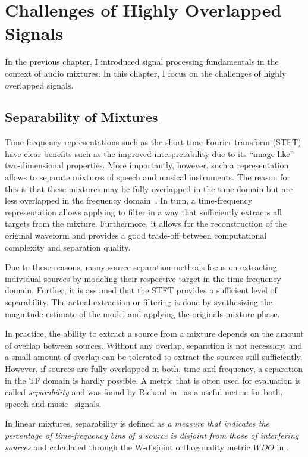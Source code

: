 \hypertarget{highly-overlapped-signals}{%
\chapter{Challenges of Highly Overlapped Signals}\label{cha:highly-overlapped-signals}}

In the previous chapter, I introduced signal processing fundamentals in the context of audio mixtures. In this chapter, I focus on the challenges of highly overlapped signals.

\hypertarget{separability-of-mixtures}{%
\section{Separability of Mixtures}\label{separability-of-mixtures}}

Time-frequency representations such as the short-time Fourier transform (STFT) have clear benefits such as the improved interpretability due to its ``image-like'' two-dimensional properties.
More importantly, however, such a representation allows to separate mixtures of speech and musical instruments.
The reason for this is that these mixtures may be fully overlapped in the time domain but are less overlapped in the frequency domain~\cite{rickard02, giannoulis11, rafii}.
In turn, a time-frequency representation allows applying to filter in a way that sufficiently extracts all targets from the mixture.
Furthermore, it allows for the reconstruction of the original waveform and provides a good trade-off between computational complexity and separation quality.
\par
Due to these reasons, many source separation methods focus on extracting individual sources by modeling their respective target in the time-frequency domain.
Further, it is assumed that the STFT provides a sufficient level of separability.
The actual extraction or filtering is done by synthesizing the magnitude estimate of the model and applying the originals mixture phase.
\par
In practice, the ability to extract a source from a mixture depends on the amount of overlap between sources.
Without any overlap, separation is not necessary, and a small amount of overlap can be tolerated to extract the sources still sufficiently.
However, if sources are fully overlapped in both, time and frequency, a separation in the TF domain is hardly possible.
A metric that is often used for evaluation is called \emph{separability} and was found by Rickard in~\cite{rickard02} as a useful metric for both, speech and music~\cite{giannoulis11} signals.
\par
In linear mixtures, separability is defined as \emph{a measure that indicates the percentage of time-frequency bins of a source is disjoint from those of interfering sources} and calculated through the W-disjoint orthogonality metric \(WDO\) in \cite{rickard02}.

